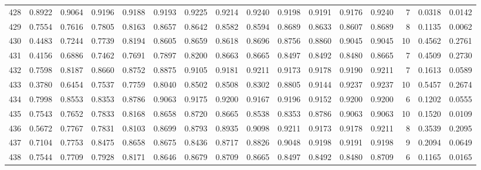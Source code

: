 \begin{tabular}{lrrrrrrrrrrrrrrr}
428 &      0.8922 &  0.9064 &  0.9196 &  0.9188 &  0.9193 &  0.9225 &  0.9214 &  0.9240 &  0.9198 &  0.9191 &   0.9176 &     0.9240 &      7 &                    0.0318 &                     0.0142 \\
429 &      0.7554 &  0.7616 &  0.7805 &  0.8163 &  0.8657 &  0.8642 &  0.8582 &  0.8594 &  0.8689 &  0.8633 &   0.8607 &     0.8689 &      8 &                    0.1135 &                     0.0062 \\
430 &      0.4483 &  0.7244 &  0.7739 &  0.8194 &  0.8605 &  0.8659 &  0.8618 &  0.8696 &  0.8756 &  0.8860 &   0.9045 &     0.9045 &     10 &                    0.4562 &                     0.2761 \\
431 &      0.4156 &  0.6886 &  0.7462 &  0.7691 &  0.7897 &  0.8200 &  0.8663 &  0.8665 &  0.8497 &  0.8492 &   0.8480 &     0.8665 &      7 &                    0.4509 &                     0.2730 \\
432 &      0.7598 &  0.8187 &  0.8660 &  0.8752 &  0.8875 &  0.9105 &  0.9181 &  0.9211 &  0.9173 &  0.9178 &   0.9190 &     0.9211 &      7 &                    0.1613 &                     0.0589 \\
433 &      0.3780 &  0.6454 &  0.7537 &  0.7759 &  0.8040 &  0.8502 &  0.8508 &  0.8302 &  0.8805 &  0.9144 &   0.9237 &     0.9237 &     10 &                    0.5457 &                     0.2674 \\
434 &      0.7998 &  0.8553 &  0.8353 &  0.8786 &  0.9063 &  0.9175 &  0.9200 &  0.9167 &  0.9196 &  0.9152 &   0.9200 &     0.9200 &      6 &                    0.1202 &                     0.0555 \\
435 &      0.7543 &  0.7652 &  0.7833 &  0.8168 &  0.8658 &  0.8720 &  0.8665 &  0.8538 &  0.8353 &  0.8786 &   0.9063 &     0.9063 &     10 &                    0.1520 &                     0.0109 \\
436 &      0.5672 &  0.7767 &  0.7831 &  0.8103 &  0.8699 &  0.8793 &  0.8935 &  0.9098 &  0.9211 &  0.9173 &   0.9178 &     0.9211 &      8 &                    0.3539 &                     0.2095 \\
437 &      0.7104 &  0.7753 &  0.8475 &  0.8658 &  0.8675 &  0.8436 &  0.8717 &  0.8826 &  0.9048 &  0.9198 &   0.9191 &     0.9198 &      9 &                    0.2094 &                     0.0649 \\
438 &      0.7544 &  0.7709 &  0.7928 &  0.8171 &  0.8646 &  0.8679 &  0.8709 &  0.8665 &  0.8497 &  0.8492 &   0.8480 &     0.8709 &      6 &                    0.1165 &                     0.0165 \\

\end{tabular}
